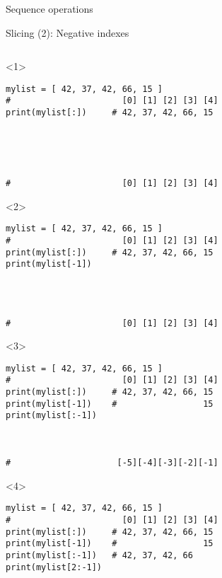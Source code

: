 \begin{frame}[fragile]{Sequence operations}

  \begin{center}

  Slicing (2): Negative indexes

  \bigskip

  \begin{columns}[onlytextwidth]
    \begin{column}{\textwidth}

      \begin{onlyenv}<1>
        \begin{lstlisting}[style=python,morekeywords={for, in, range, list}]
mylist = [ 42, 37, 42, 66, 15 ]
#                      [0] [1] [2] [3] [4]
print(mylist[:])     # 42, 37, 42, 66, 15





#                      [0] [1] [2] [3] [4] \end{lstlisting}
      \end{onlyenv}

      \begin{onlyenv}<2>
        \begin{lstlisting}[style=python,morekeywords={for, in, range, list}]
mylist = [ 42, 37, 42, 66, 15 ]
#                      [0] [1] [2] [3] [4]
print(mylist[:])     # 42, 37, 42, 66, 15
print(mylist[-1])




#                      [0] [1] [2] [3] [4] \end{lstlisting}
      \end{onlyenv}

      \begin{onlyenv}<3>
        \begin{lstlisting}[style=python,morekeywords={for, in, range, list}]
mylist = [ 42, 37, 42, 66, 15 ]
#                      [0] [1] [2] [3] [4]
print(mylist[:])     # 42, 37, 42, 66, 15
print(mylist[-1])    #                 15
print(mylist[:-1])



#                     [-5][-4][-3][-2][-1] \end{lstlisting}
      \end{onlyenv}

      \begin{onlyenv}<4>
        \begin{lstlisting}[style=python,morekeywords={for, in, range, list}]
mylist = [ 42, 37, 42, 66, 15 ]
#                      [0] [1] [2] [3] [4]
print(mylist[:])     # 42, 37, 42, 66, 15
print(mylist[-1])    #                 15
print(mylist[:-1])   # 42, 37, 42, 66
print(mylist[2:-1])



\end{lstlisting}
\end{onlyenv}
\end{column}
\end{columns}
\end{center}
\end{frame}

